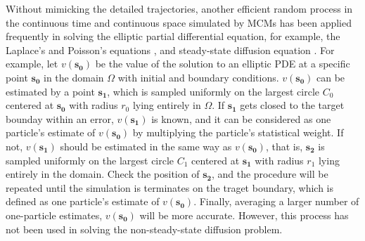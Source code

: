 Without mimicking the detailed trajectories, another efficient random
process in the continuous time and continuous space simulated by MCMs
has been applied frequently in solving the elliptic partial
differential equation, for example, the Laplace’s and Poisson’s
equations \cite{haji1967application} \cite{booth1981exact}
\cite{muller1956some}, and steady-state diffusion equation
\cite{torquato1989efficient}. For example, let $v(\bm{s_0})$ be the
value of the solution to an elliptic PDE at a specific point
$\bm{s_0}$ in the domain $\Omega$ with initial and boundary
conditions. $v(\bm{s_0})$ can be estimated by a point $\bm{s_1}$,
which is sampled uniformly on the largest circle $C_0$ centered at
$\bm{s_0}$ with radius $r_0$ lying entirely in $\Omega$. If $\bm{s_1}$
gets closed to the target bounday within an error, $v(\bm{s_1})$ is
known, and it can be considered as one particle's estimate of
$v(\bm{s_0})$ by multiplying the particle’s statistical weight. If
not, $v(\bm{s_1})$ should be estimated in the same way as
$v(\bm{s_0})$, that is, $\bm{s_2}$ is sampled uniformly on the largest
circle $C_1$ centered at $\bm{s_1}$ with radius $r_1$ lying entirely
in the domain. Check the position of $\bm{s_2}$, and the procedure
will be repeated until the simulation is terminates on the traget
boundary, which is defined as one particle's estimate of
$v(\bm{s_0})$. Finally, averaging a larger number of one-particle
estimates, $v(\bm{s_0})$ will be more accurate. However, this process
has not been used in solving the non-steady-state diffusion problem.

